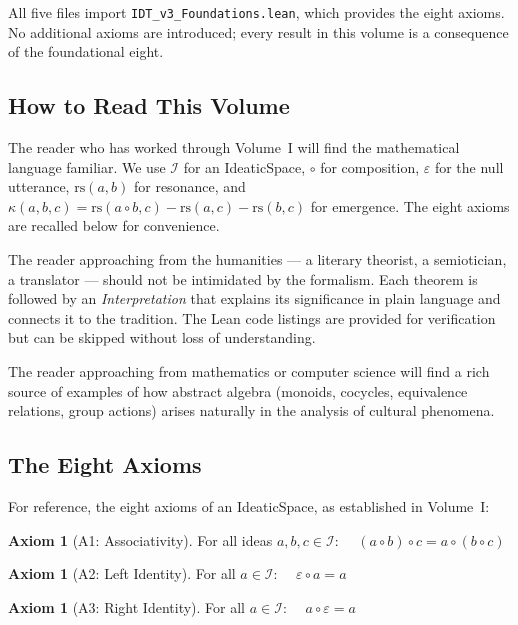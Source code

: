 \documentclass[11pt,oneside]{book}
\theoremstyle{plain}
\theoremstyle{definition}
\newtheorem{axiom_def}[theorem]{Axiom}
\theoremstyle{remark}
\newcommand{\rs}{\mathrm{rs}}
\newcommand{\emerge}{\kappa}
\newcommand{\compose}{\circ}
\newcommand{\void}{\varepsilon}
\newcommand{\IS}{\mathcal{I}}
\begin{document}
All five files import \texttt{IDT\_v3\_Foundations.lean}, which provides the
eight axioms. No additional axioms are introduced; every result in this volume
is a consequence of the foundational eight.

\subsection*{How to Read This Volume}

The reader who has worked through Volume~I will find the mathematical language
familiar. We use $\IS$ for an IdeaticSpace, $\compose$ for composition,
$\void$ for the null utterance, $\rs(a, b)$ for resonance, and
$\emerge(a, b, c) = \rs(a \compose b, c) - \rs(a, c) - \rs(b, c)$ for
emergence. The eight axioms are recalled below for convenience.

The reader approaching from the humanities --- a literary theorist, a
semiotician, a translator --- should not be intimidated by the formalism. Each
theorem is followed by an \textit{Interpretation} that explains its significance
in plain language and connects it to the tradition. The Lean code listings are
provided for verification but can be skipped without loss of understanding.

The reader approaching from mathematics or computer science will find a rich
source of examples of how abstract algebra (monoids, cocycles, equivalence
relations, group actions) arises naturally in the analysis of cultural
phenomena.

\subsection*{The Eight Axioms}

For reference, the eight axioms of an IdeaticSpace, as established in Volume~I:

\begin{axiom_def}[A1: Associativity]
For all ideas $a, b, c \in \IS$:
$\quad (a \compose b) \compose c = a \compose (b \compose c)$
\end{axiom_def}

\begin{axiom_def}[A2: Left Identity]
For all $a \in \IS$: $\quad \void \compose a = a$
\end{axiom_def}

\begin{axiom_def}[A3: Right Identity]
For all $a \in \IS$: $\quad a \compose \void = a$
\end{axiom_def}
\end{document}
